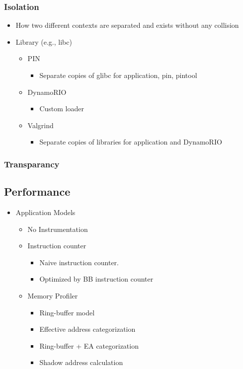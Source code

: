 \subsubsection{Isolation}
\begin{itemize}
	\item How two different contexts are separated and exists without any collision
	\item Library (e.g., libc)
	\begin{itemize}
		\item PIN 
		\begin{itemize}
			\item Separate copies of glibc for application, pin, pintool
		\end{itemize}
		\item DynamoRIO
		\begin{itemize}
			\item Custom loader
		\end{itemize}
		\item Valgrind 
		\begin{itemize}
			\item Separate copies of libraries for application and DynamoRIO
		\end{itemize}
	\end{itemize}
\end{itemize}
\subsubsection{Transparancy}
\subsection{Performance}
\begin{itemize}
	\item Application Models
	\begin{itemize}
		\item No Instrumentation
		\item Instruction counter
		\begin{itemize}
			\item Naive instruction counter.
			\item Optimized by BB instruction counter
		\end{itemize}
		\item Memory Profiler
		\begin{itemize}
			\item Ring-buffer model
			\item Effective address categorization
			\item Ring-buffer + EA categorization
			\item Shadow address calculation
		\end{itemize}
	\end{itemize}
\end{itemize}
